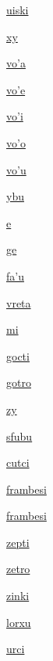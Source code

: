 {\hyperlink{val:uiski}{uiski}}{}{}{}

{\hyperlink{val:xy}{xy}}{}{}{}

{\hyperlink{val:voha}{vo'a}}{}{}{}

{\hyperlink{val:vohe}{vo'e}}{}{}{}

{\hyperlink{val:vohi}{vo'i}}{}{}{}

{\hyperlink{val:voho}{vo'o}}{}{}{}

{\hyperlink{val:vohu}{vo'u}}{}{}{}

{\hyperlink{val:ybu}{ybu}}{}{}{}

{\hyperlink{val:e}{e}}{}{}{}

{\hyperlink{val:ge}{ge}}{}{}{}

{\hyperlink{val:fahu}{fa'u}}{}{}{}

{\hyperlink{val:vreta}{vreta}}{}{}{}

{\hyperlink{val:mi}{mi}}{}{}{}

{\hyperlink{val:gocti}{gocti}}{}{}{}

{\hyperlink{val:gotro}{gotro}}{}{}{}

{\hyperlink{val:zy}{zy}}{}{}{}

{\hyperlink{val:sfubu}{sfubu}}{}{}{}

{\hyperlink{val:cutci}{cutci}}{}{}{}

{\hyperlink{val:frambesi}{frambesi}}{}{}{}

{\hyperlink{val:frambesi}{frambesi}}{}{}{}

{\hyperlink{val:zepti}{zepti}}{}{}{}

{\hyperlink{val:zetro}{zetro}}{}{}{}

{\hyperlink{val:zinki}{zinki}}{}{}{}

{\hyperlink{val:lorxu}{lorxu}}{}{}{}

{\hyperlink{val:urci}{urci}}{}{}{}

